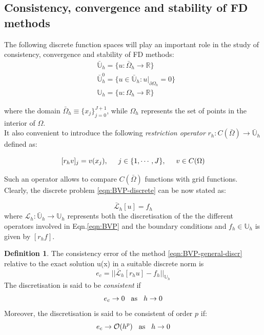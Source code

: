\documentclass[11pt]{article}
\theoremstyle{theorem}
\theoremstyle{definition}
\newtheorem{definition}{Definition}
\begin{document}
\subsection{Consistency, convergence and stability of FD methods}
The following discrete function spaces will play an important role in the study of consistency, convergence and stability of FD methods:
\begin{align*}
	&\bar{\mathbb{U}}_h=\lbrace u:\bar{\Omega}_h\rightarrow\mathbb{R}\rbrace\\
	&\bar{\mathbb{U}}^0_h=\lbrace u\in\bar{\mathbb{U}}_h : u|_{\partial\Omega_h}=0\rbrace\\
	&{\mathbb{U}}_h=\lbrace u:\Omega_h\rightarrow\mathbb{R}\rbrace
\end{align*}

where the domain $\bar{\Omega}_h\equiv\lbrace x_j\rbrace_{j=0}^{J+1}$, while $\Omega_h$ represents the set of points in the interior of $\Omega$.\\
It also convenient to introduce the following \emph{restriction operator} $r_h:C(\bar{\Omega})\rightarrow\bar{\mathbb{U}}_h$ defined as:

$$[r_h v]_j=v(x_j),\hspace{5mm}j\in\lbrace 1, \cdots, J\rbrace,\hspace{5mm} v\in C(\Omega)$$

Such an operator allows to compare $C(\bar{\Omega})$ functions with grid functions.\\

Clearly, the discrete problem \eqref{eqn:BVP-discrete} can be now stated as:

\begin{equation}
	\label{eqn:BVP-general-discr}
\end{equation}
$$\bar{\mathcal{L}}_h[u]=f_h$$
where $\mathcal{L}_h:\bar{\mathbb{U}}_h\rightarrow\mathbb{U}_h$ represents both the discretisation of the the different operators involved in Eqn.\eqref{eqn:BVP} and the boundary conditions and $f_h\in\mathbb{U}_h$ is given by $[r_hf]$.\\

\begin{definition}
	\label{defn:consistency}
	The consistency error of the method \eqref{eqn:BVP-general-discr} relative to the exact solution u(x) in a suitable discrete norm is
	$$e_c=||\bar{\mathcal{L}}_h[r_hu]-f_h||_{\mathbb{U}_h} $$
	The discretisation is said to be \emph{consistent} if 
	\begin{equation}
		\label{eqn:consistent}
		e_c\rightarrow 0\hspace{3mm}\text{as}\hspace{3mm}h\rightarrow 0
	\end{equation}
	Moreover, the discretisation is said to be consistent of order $p$ if:
	\begin{equation}
	\label{eqn:consistent-p}
	e_c\rightarrow\mathcal{O}(h^p)\hspace{3mm}\text{as}\hspace{3mm}h\rightarrow 0
	\end{equation}
\end{definition}
\end{document}
